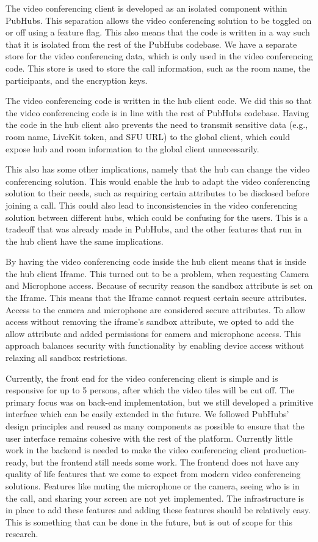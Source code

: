 \documentclass{report}
\begin{document}
The video conferencing client is developed as an isolated component within PubHubs. This separation allows the
video conferencing solution to be toggled on or off using a feature flag.
This also means that the code is written in a way such that it is isolated from the rest of the PubHubs codebase.
We have a separate store for the video conferencing data, which is only used in the video conferencing code.
This store is used to store the call information, such as the room name, the participants, and the encryption keys.

The video conferencing code is written in the hub client code. We did this so that the video conferencing code is in
line with the rest of PubHubs codebase.
Having the code in the hub client also prevents the need to transmit sensitive data (e.g., room name, LiveKit token,
and SFU URL) to the global client, which could expose hub and room information to the global client unnecessarily.

This also has some other implications, namely that the hub can change the video conferencing solution.
This would enable the hub to adapt the video conferencing solution to their needs, such as requiring certain
attributes to be disclosed before joining a call.
This could also lead to inconsistencies in the video conferencing solution between different hubs, which could be
confusing for the users. This is a tradeoff that was already made in PubHubs, and the other features that run in the
hub client have the same implications.

By having the video conferencing code inside the hub client means that is inside the hub client Iframe.
This turned out to be a problem, when requesting Camera and Microphone access. Because of security reason the
sandbox attribute is set on the Iframe. This means that the Iframe cannot request certain secure attributes.
Access to the camera and microphone are considered secure attributes.
To allow access without removing the iframe’s sandbox attribute, we opted to add the allow attribute and added
permissions for camera and microphone access.
This approach balances security with functionality by enabling device access without relaxing all sandbox restrictions.

Currently, the front end for the video conferencing client is simple and is responsive for up to 5 persons, after which
the video tiles will be cut off.
The primary focus was on back-end implementation, but we still developed a primitive interface which can be easily
extended in the future.
We followed PubHubs’ design principles and reused as many components as possible to ensure that the user interface
remains cohesive with the rest of the platform. Currently little work in the backend is needed to make the video
conferencing client production-ready, but the frontend still needs some work. The frontend does not have any quality
of life features that we come to expect from modern video conferencing solutions. Features like muting the
microphone or the camera, seeing who is in the call, and sharing your screen are not yet implemented. The
infrastructure is in place to add these features and adding these features should be relatively easy. This is
something that can be done in the future, but is out of scope for this research.
\end{document}
